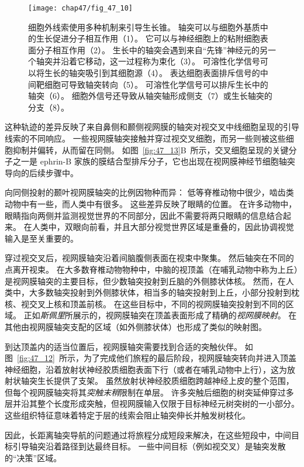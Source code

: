 \begin{figure}[htbp]
	\centering
	\texttt{[image: chap47/fig\_47\_10]}
	\caption{细胞外线索使用多种机制来引导生长锥。
		轴突可以与细胞外基质中的生长促进分子相互作用（1）。
		它可以与神经细胞上的粘附细胞表面分子相互作用（2）。
		生长中的轴突会遇到来自“先锋”神经元的另一个轴突并沿着它移动，这一过程称为束化（3）。
		可溶性化学信号可以将生长的轴突吸引到其细胞源（4）。
		表达细胞表面排斥信号的中间靶细胞可导致轴突转向（5）。
		可溶性化学信号可以排斥生长中的轴突（6）。
		细胞外信号还导致从轴突轴形成侧支（7）或生长轴突的分支（8）。}
	\label{fig:47_10}
\end{figure}


这种轨迹的差异反映了来自鼻侧和颞侧视网膜的轴突对视交叉中线细胞呈现的引导线索的不同响应。
一些视网膜轴突接触并穿过视交叉细胞，而另一些则被这些细胞抑制并偏转，从而留在同侧。
如图~\ref{fig:47_13}B~所示，交叉细胞呈现的关键分子之一是 ephrin-B 家族的膜结合型排斥分子，它也出现在视网膜神经节细胞轴突导向的后续步骤中。


向同侧投射的颞叶视网膜轴突的比例因物种而异：
低等脊椎动物中很少，啮齿类动物中有一些，而人类中有很多。
这些差异反映了眼睛的位置。
在许多动物中，眼睛指向两侧并监测视觉世界的不同部分，因此不需要将两只眼睛的信息结合起来。
在人类中，双眼向前看，并且大部分视觉世界区域是重叠的，因此协调视觉输入是至关重要的。


穿过视交叉后，视网膜轴突沿着间脑腹侧表面在视束中聚集。
然后轴突在不同的点离开视束。
在大多数脊椎动物物种中，中脑的视顶盖（在哺乳动物中称为上丘）是视网膜轴突的主要目标，但少数轴突投射到丘脑的外侧膝状体核。
然而，在人类中，大多数轴突投射到外侧膝状体，相当多的轴突投射到上丘，小部分投射到枕核、视交叉上核和顶盖前核。
在这些目标中，不同的视网膜轴突投射到不同的区域。
正如\textit{斯佩里}所展示的，视网膜轴突在顶盖表面形成了精确的\textit{视网膜映射}。
在其他由视网膜轴突支配的区域（如外侧膝状体）也形成了类似的映射图。


到达顶盖内的适当位置后，视网膜轴突需要找到合适的突触伙伴。
如图~\ref{fig:47_12}~所示，为了完成他们旅程的最后阶段，视网膜轴突转向并进入顶盖神经细胞，沿着放射状神经胶质细胞表面下行（或者在哺乳动物中上行），这为放射状轴突生长提供了支架。
虽然放射状神经胶质细胞跨越神经上皮的整个范围，但每个视网膜轴突将其\textit{突触末稍}限制在单层。
许多突触后细胞的树突延伸穿过多层并沿其整个长度形成突触，但视网膜输入仅限于目标神经元树突树的一小部分。
这些组织特征意味着特定于层的线索会阻止轴突伸长并触发树枝化。


因此，长距离轴突导航的问题通过将旅程分成短段来解决，在这些短段中，中间目标引导轴突沿着路径到达最终目标。
一些中间目标（例如视交叉）是轴突发散的“决策”区域。


